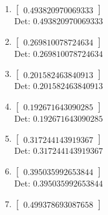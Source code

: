 \documentclass[12pt]{article}
\begin{document}
\begin{enumerate}

\item $\displaystyle \left[\begin{matrix}0.493820970069333\end{matrix}\right]$\\

Det: $0.493820970069333$\\

\item $\displaystyle \left[\begin{matrix}0.269810078724634\end{matrix}\right]$\\

Det: $0.269810078724634$\\

\item $\displaystyle \left[\begin{matrix}0.201582463840913\end{matrix}\right]$\\

Det: $0.201582463840913$\\

\item $\displaystyle \left[\begin{matrix}0.192671643090285\end{matrix}\right]$\\

Det: $0.192671643090285$\\

\item $\displaystyle \left[\begin{matrix}0.317244143919367\end{matrix}\right]$\\

Det: $0.317244143919367$\\

\item $\displaystyle \left[\begin{matrix}0.395035992653844\end{matrix}\right]$\\

Det: $0.395035992653844$\\

\item $\displaystyle \left[\begin{matrix}0.499378693087658\end{matrix}\right]$\\


\end{enumerate}
\end{document}
